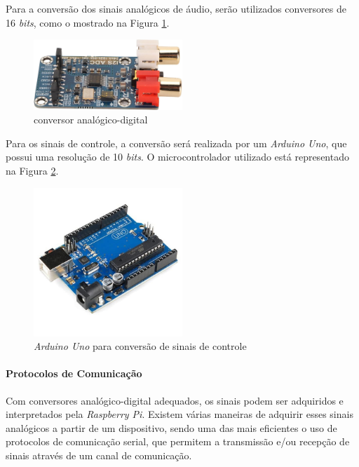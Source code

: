 Para a conversão dos sinais analógicos de áudio, serão utilizados conversores de 16 \textit{bits}, como o mostrado na Figura \ref{fig63}.

\begin{figure}[h]
    \centering
    \includegraphics[width=0.5\textwidth]{figuras/fig63.jpg}
    \caption{conversor analógico-digital \cite{walmartRobotHuman}}
    \label{fig63}
\end{figure}

Para os sinais de controle, a conversão será realizada por um \textit{Arduino Uno}, que possui uma resolução de 10 \textit{bits}. O microcontrolador utilizado está representado na Figura \ref{fig64}.

\begin{figure}[h]
    \centering
    \includegraphics[width=0.5\textwidth]{figuras/fig64.jpeg}
    \caption{\textit{Arduino Uno} para conversão de sinais de controle \cite{vidadesilicioPlacaCabo}}
    \label{fig64}
\end{figure}

\paragraph{Protocolos de Comunicação}
Com conversores analógico-digital adequados, os sinais podem ser adquiridos e interpretados pela \textit{Raspberry Pi}. Existem várias maneiras de adquirir esses sinais analógicos a partir de um dispositivo, sendo uma das mais eficientes o uso de protocolos de comunicação serial, que permitem a transmissão e/ou recepção de sinais através de um canal de comunicação.

